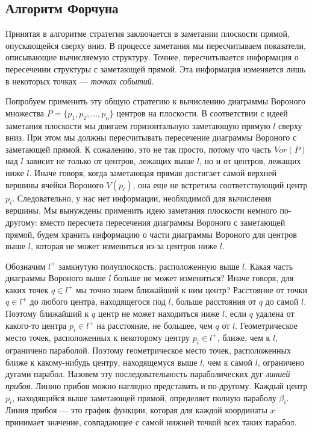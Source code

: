 \subsection{Алгоритм Форчуна}

Принятая  в  алгоритме  стратегия  заключается  в  заметании  плоскости  прямой, опускающейся  сверху  вниз.
В  процессе  заметания  мы  пересчитываем  показатели, описывающие  вычисляемую  структуру.
Точнее,  пересчитывается  информация  о пересечении  структуры  с  заметающей  прямой.
Эта  информация  изменяется  лишь в  некоторых  точках --- \textit{точках  событий}.

Попробуем  применить  эту  общую  стратегию  к  вычислению  диаграммы  Вороного  множества $P = \{p_1, p_2, ..., p_n\}$ центров  на  плоскости.
В  соответствии  с  идеей  заметания плоскости  мы  двигаем  горизонтальную  заметающую  прямую  $l$  сверху  вниз.
При  этом  мы  должны  пересчитывать пересечение  диаграммы  Вороного  с  заметающей  прямой.
К  сожалению,  это  не  так  просто,  потому  что  часть  $Vor(P)$ над $l$ зависит  не  только  от  центров,  лежащих  выше  $l$,  но  и от  центров,  лежащих  ниже $l$.
Иначе  говоря,  когда  заметающая  прямая  достигает  самой  верхней  вершины  ячейки Вороного $V(p_i)$,  она  еще  не  встретила  соответствующий  центр $p_i$.
Следовательно, у  нас  нет  информации,  необходимой  для  вычисления  вершины.
Мы  вынуждены применить  идею  заметания  плоскости  немного  по-другому:  вместо  пересчета  пересечения  диаграммы  Вороного  с заметающей  прямой,  будем  хранить  информацию о  части  диаграммы  Вороного  для  центров  выше $l$,  которая  не  может измениться из-за  центров  ниже $l$.

Обозначим $l^+$ замкнутую  полуплоскость,  расположенную  выше  $l$.
Какая  часть диаграммы  Вороного  выше $l$ больше  не  может  измениться? 
Иначе  говоря,  для  каких  точек $q \in l^+$ мы  точно  знаем  ближайший  к  ним  центр?
Расстояние  от  точки $q \in l^+$  до  любого  центра,  находящегося  под  $l$,  больше  расстояния  от $q$ до  самой $l$.  Поэтому  ближайший  к  $q$  центр  не  может  находиться  ниже $l$,  если  $q$  удалена  от какого-то  центра $p_i \in l^+$ на  расстояние,  не  большее,  чем  $q$  от $l$.
Геометрическое  место  точек,  расположенных  к  некоторому  центру  $p_i \in l^+$,  ближе,  чем  к $l$,  ограничено параболой.
Поэтому  геометрическое  место  точек,  расположенных  ближе  к  какому-нибудь  центру,  находящемуся  выше $l$,  чем  к  самой  $l$,  ограничено  дугами  парабол.
Назовем  эту  последовательность  параболических  дуг  \textit{линией  прибоя}.
Линию прибоя  можно  наглядно  представить  и  по-другому.  Каждый  центр $p_i$,  находящийся выше  заметающей  прямой,  определяет  полную  параболу $\beta_i$.
Линия  прибоя --- это график  функции,  которая  для  каждой  координаты $x$ принимает  значение,  совпадающее  с  самой  нижней  точкой  всех  таких  парабол.


